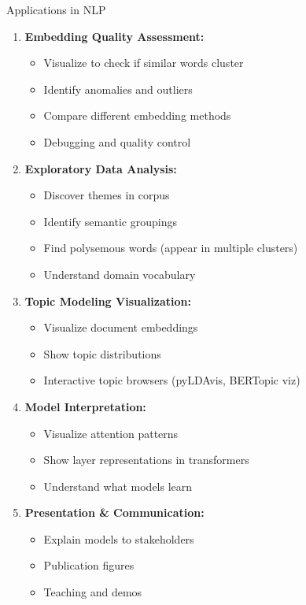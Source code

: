 \documentclass[aspectratio=169]{beamer}
\begin{document}
\begin{frame}[shrink=10]{Applications in NLP 🚀}
\begin{enumerate}\setlength{\itemsep}{0pt}
    \item \textbf{Embedding Quality Assessment:}
    \begin{itemize}\setlength{\itemsep}{0pt}
        \item Visualize to check if similar words cluster
        \item Identify anomalies and outliers
        \item Compare different embedding methods
        \item Debugging and quality control
    \end{itemize}

    \item \textbf{Exploratory Data Analysis:}
    \begin{itemize}\setlength{\itemsep}{0pt}
        \item Discover themes in corpus
        \item Identify semantic groupings
        \item Find polysemous words (appear in multiple clusters)
        \item Understand domain vocabulary
    \end{itemize}

    \item \textbf{Topic Modeling Visualization:}
    \begin{itemize}\setlength{\itemsep}{0pt}
        \item Visualize document embeddings
        \item Show topic distributions
        \item Interactive topic browsers (pyLDAvis, BERTopic viz)
    \end{itemize}

    \item \textbf{Model Interpretation:}
    \begin{itemize}\setlength{\itemsep}{0pt}
        \item Visualize attention patterns
        \item Show layer representations in transformers
        \item Understand what models learn
    \end{itemize}

    \item \textbf{Presentation \& Communication:}
    \begin{itemize}\setlength{\itemsep}{0pt}
        \item Explain models to stakeholders
        \item Publication figures
        \item Teaching and demos
    \end{itemize}
\end{enumerate}
\end{frame}
\end{document}
